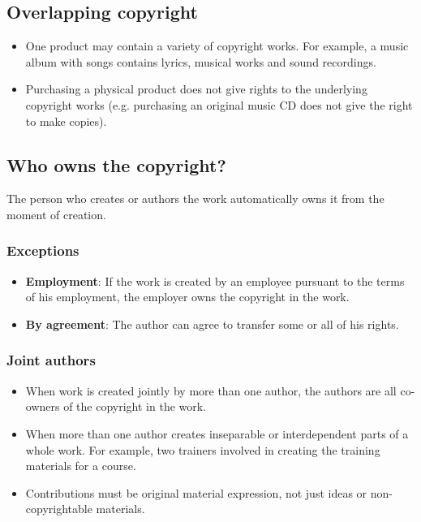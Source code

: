 \documentclass[11pt]{article}
\begin{document}
\subsection{Overlapping copyright}
\label{sec:orgca22571}
\begin{itemize}
\item One product may contain a variety of copyright works. For example, a music album with songs contains lyrics, musical works and sound recordings.
\item Purchasing a physical product does not give rights to the underlying copyright works (e.g. purchasing an original music CD does not give the right to make copies).
\end{itemize}
\subsection{Who owns the copyright?}
\label{sec:orgdf93d6d}
The person who creates or authors the work automatically owns it from the moment of creation.
\subsubsection{Exceptions}
\label{sec:orga9e0e8b}
\begin{itemize}
\item \textbf{Employment}: If the work is created by an employee pursuant to the terms of his employment, the employer owns the copyright in the work.
\item \textbf{By agreement}: The author can agree to transfer some or all of his rights.
\end{itemize}
\subsubsection{Joint authors}
\label{sec:org876ffc1}
\begin{itemize}
\item When work is created jointly by more than one author, the authors are all co-owners of the copyright in the work.
\item When more than one author creates inseparable or interdependent parts of a whole work. For example, two trainers involved in creating the training materials for a course.
\item Contributions must be original material expression, not just ideas or non-copyrightable materials.
\end{itemize}
\end{document}
